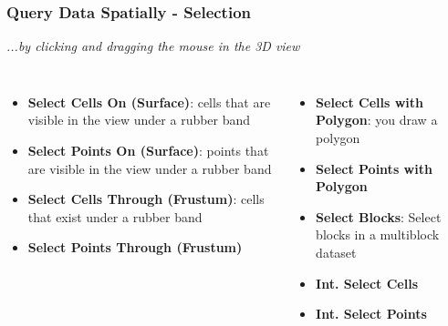 \documentclass[]{beamer}
\begin{document}
\begin{frame}
\frametitle{Query Data Spatially - Selection}
    \textit{...by clicking and dragging the mouse in the 3D view}
    \begin{columns}[c] %
        \begin{itemize}
            \item {\bf Select Cells On (Surface)}: cells that are visible in the view under a rubber band
            \item {\bf Select Points On (Surface)}: points that are visible in the view under a rubber band
            \item {\bf Select Cells Through (Frustum)}: cells that exist under a rubber band
            \item {\bf Select Points Through (Frustum)}
        \end{itemize}
        \begin{itemize}     
            \item {\bf Select Cells with Polygon}: you draw a polygon
            \item {\bf Select Points with Polygon}
            \item {\bf Select Blocks}: Select blocks in a multiblock dataset
            \item {\bf Int. Select Cells}
            \item {\bf Int. Select Points}
         \end{itemize}
    \end{columns}
\end{frame}

\end{document}
